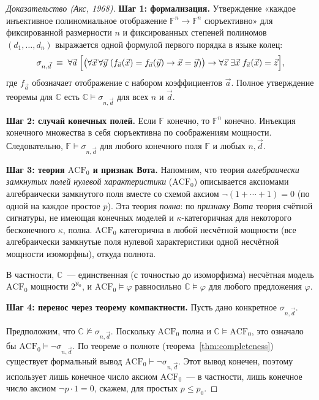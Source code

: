 \documentclass[12pt, a4paper]{article}
\theoremstyle{plain}
\theoremstyle{definition}
\renewcommand{\models}{\vDash}
\begin{document}
\begin{proof}[Доказательство (Акс, 1968)]

\textbf{Шаг 1: формализация.}
Утверждение «каждое инъективное полиномиальное отображение $\mathbb{F}^n \to \mathbb{F}^n$
сюръективно» для фиксированной размерности $n$ и фиксированных степеней полиномов
$(d_1,\ldots,d_n)$ выражается одной формулой первого порядка в языке колец:
\[
  \sigma_{n,\vec d} \;\equiv\;
  \forall \vec a\; \Bigl[
    \bigl(\forall \vec x\,\forall \vec y\;
      (f_{\vec a}(\vec x)=f_{\vec a}(\vec y) \to \vec x = \vec y)\bigr)
    \to
    \forall \vec z\;\exists \vec x\;f_{\vec a}(\vec x) = \vec z
  \Bigr],
\]
где $f_{\vec a}$ обозначает отображение с набором коэффициентов $\vec a$.
Полное утверждение теоремы для $\mathbb{C}$ есть $\mathbb{C} \models \sigma_{n,\vec d}$
для всех $n$ и $\vec d$.

\textbf{Шаг 2: случай конечных полей.}
Если $\mathbb{F}$ конечно, то $\mathbb{F}^n$ конечно. Инъекция конечного
множества в себя сюръективна по соображениям мощности. Следовательно,
$\mathbb{F} \models \sigma_{n,\vec d}$ для любого конечного поля $\mathbb{F}$
и любых $n,\vec d$.

\textbf{Шаг 3: теория $\mathrm{ACF}_0$ и признак Вота.}
Напомним, что теория \emph{алгебраически замкнутых полей нулевой характеристики}
($\mathrm{ACF}_0$) описывается аксиомами алгебраически замкнутого поля вместе со
схемой аксиом $\neg(1+\cdots+1)=0$ (по одной на каждое простое $p$). Эта теория
\emph{полна}: по \emph{признаку Вота} теория счётной сигнатуры, не имеющая конечных
моделей и $\kappa$-категоричная для некоторого бесконечного $\kappa$, полна.
$\mathrm{ACF}_0$ категорична в любой несчётной мощности (все алгебраически замкнутые
поля нулевой характеристики одной несчётной мощности изоморфны), откуда полнота.

В частности, $\mathbb{C}$~--- единственная (с точностью до изоморфизма) несчётная
модель $\mathrm{ACF}_0$ мощности $2^{\aleph_0}$, и $\mathrm{ACF}_0 \models \varphi$
равносильно $\mathbb{C} \models \varphi$ для любого предложения $\varphi$.

\textbf{Шаг 4: перенос через теорему компактности.}
Пусть дано конкретное $\sigma_{n,\vec d}$.

Предположим, что $\mathbb{C} \not\models \sigma_{n,\vec d}$.
Поскольку $\mathrm{ACF}_0$ полна и $\mathbb{C} \models \mathrm{ACF}_0$, это
означало бы $\mathrm{ACF}_0 \models \neg\sigma_{n,\vec d}$. По теореме о полноте
(теорема~\ref{thm:completeness}) существует формальный вывод
$\mathrm{ACF}_0 \vdash \neg\sigma_{n,\vec d}$. Этот вывод конечен, поэтому
использует лишь конечное число аксиом $\mathrm{ACF}_0$~--- в частности,
лишь конечное число аксиом $\neg p\cdot 1 = 0$, скажем, для простых
$p \le p_0$.


\end{proof}
\end{document}
